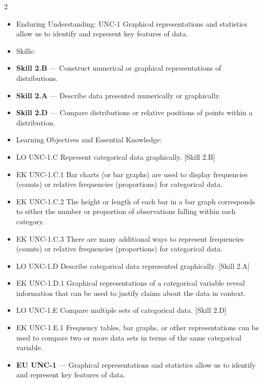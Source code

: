 \documentclass[11pt]{article}
\begin{document}

\begin{multicols}{2}
{\footnotesize\setlength{\parskip}{0pt}
\begin{itemize}[leftmargin=*,itemsep=0pt,topsep=0pt]
\item Enduring Understanding: UNC-1 Graphical representations and statistics allow us to identify and represent key features of data.
\item Skills:
\item \textbf{Skill 2.B} --- Construct numerical or graphical representations of distributions.
\item \textbf{Skill 2.A} --- Describe data presented numerically or graphically.
\item \textbf{Skill 2.D} --- Compare distributions or relative positions of points within a distribution.
\item Learning Objectives and Essential Knowledge:
\item LO UNC-1.C Represent categorical data graphically. [Skill 2.B]
\item EK UNC-1.C.1 Bar charts (or bar graphs) are used to display frequencies (counts) or relative frequencies (proportions) for categorical data.
\item EK UNC-1.C.2 The height or length of each bar in a bar graph corresponds to either the number or proportion of observations falling within each category.
\item EK UNC-1.C.3 There are many additional ways to represent frequencies (counts) or relative frequencies (proportions) for categorical data.
\item LO UNC-1.D Describe categorical data represented graphically. [Skill 2.A]
\item EK UNC-1.D.1 Graphical representations of a categorical variable reveal information that can be used to justify claims about the data in context.
\item LO UNC-1.E Compare multiple sets of categorical data. [Skill 2.D]
\item EK UNC-1.E.1 Frequency tables, bar graphs, or other representations can be used to compare two or more data sets in terms of the same categorical variable.
\item \textbf{EU UNC-1} --- Graphical representations and statistics allow us to identify and represent key features of data.

\end{itemize}}
\end{multicols}
\end{document}
